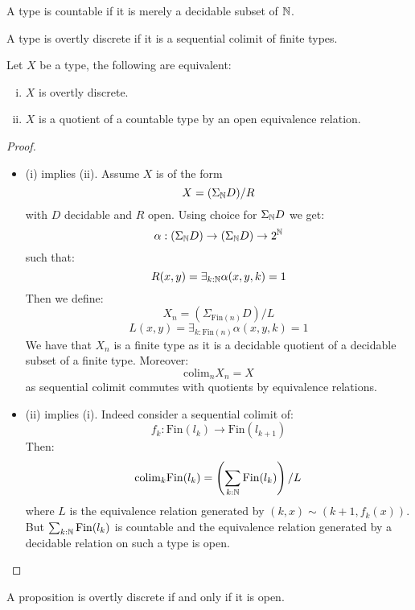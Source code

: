 \begin{definition}
A type is countable if it is merely a decidable subset of $\mathbb{N}$.
\end{definition}

\begin{definition}
A type is overtly discrete if it is a sequential colimit of finite types.
\end{definition}

\begin{lemma}\label{overtly-discrete-colimit-finite}
Let $X$ be a type, the following are equivalent:
\begin{enumerate}[(i)]
\item $X$ is overtly discrete.
\item $X$ is a quotient of a countable type by an open equivalence relation.
\end{enumerate}
\end{lemma}

\begin{proof}
\begin{itemize}
\item (i) implies (ii). Assume $X$ is of the form
\[X  = (\Sigma_{\mathbb{N}} D)/R\]
with $D$ decidable and $R$ open. Using choice for $\Sigma_{\mathbb{N}} D$ we get:
\[\alpha : (\Sigma_{\mathbb{N}} D) \to (\Sigma_{\mathbb{N}} D)\to 2^{\mathbb{N}}\]
such that:
\[R(x,y) = \exists_{k:\mathbb{N}} \alpha(x,y,k) = 1\]
Then we define:
\[X_n = (\Sigma_{\mathrm{Fin}(n)} D) / L\]
\[L(x,y) = \exists_{k:\mathrm{Fin}(n)} \alpha(x,y,k) = 1\]
We have that $X_n$ is a finite type as it is a decidable quotient of a decidable subset of a finite type. Moreover:
\[\mathrm{colim}_n X_n = X\]
as sequential colimit commutes with quotients by equivalence relations.
\item (ii) implies (i). Indeed consider a sequential colimit of:
\[f_k : \mathrm{Fin}(l_k) \to \mathrm{Fin}(l_{k+1})\]
Then:
\[\mathrm{colim}_k \mathrm{Fin}(l_k)  =  \left(\sum_{k:\mathbb{N}} \mathrm{Fin}(l_k)\right) / L\]
where $L$ is the equivalence relation generated by $(k,x) \sim (k+1,f_k(x))$. But $\sum_{k:\mathbb{N}} \mathrm{Fin}(l_k)$ is countable and the equivalence relation generated by a decidable relation on such a type is open.
\end{itemize}
\end{proof}

\begin{remark}
A proposition is overtly discrete if and only if it is open.
\end{remark}


